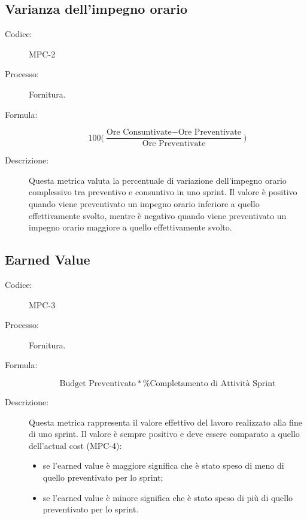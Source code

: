 \subsection{Varianza dell’impegno orario}
\begin{description}
    \item[Codice:] MPC-2
    \item[Processo:] Fornitura.
    \item[Formula:]
    \begin{equation}
        100\biggl(\frac{\text{Ore Consuntivate} - \text{Ore Preventivate}}{\text{Ore Preventivate}}\biggr)
    \end{equation}
    \item[Descrizione:] Questa metrica valuta la percentuale di variazione dell'impegno orario complessivo tra preventivo e consuntivo in uno sprint. Il valore è positivo quando viene preventivato un impegno orario inferiore a quello effettivamente svolto, mentre è negativo quando viene preventivato un impegno orario maggiore a quello effettivamente svolto.
\end{description}

\subsection{Earned Value}
\begin{description}
    \item[Codice:] MPC-3
    \item[Processo:] Fornitura.
    \item[Formula:]
    \begin{equation}
        \text{Budget Preventivato} * \% \text{Completamento di Attività Sprint} 
    \end{equation}
    \item[Descrizione:] Questa metrica rappresenta il valore effettivo del lavoro realizzato alla fine di uno sprint. Il valore è sempre positivo e deve essere comparato a quello dell'actual cost (MPC-4):
    \begin{itemize}
        \item se l'earned value è maggiore significa che è stato speso di meno di quello preventivato per lo sprint;
        \item se l'earned value è minore significa che è stato speso di più di quello preventivato per lo sprint.
    \end{itemize}
\end{description}

